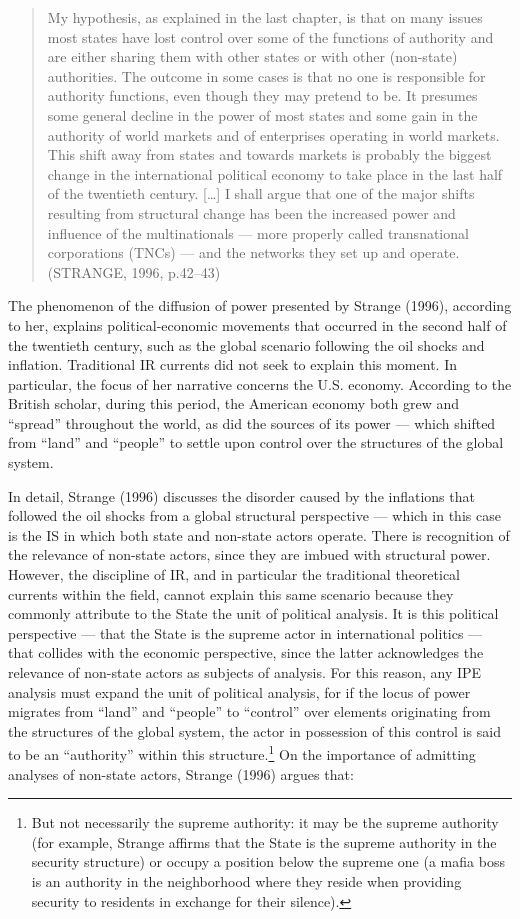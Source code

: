 \begin{quote}
My hypothesis, as explained in the last chapter, is that on many issues most states have lost control over some of the functions of authority and are either sharing them with other states or with other (non-state) authorities. The outcome in some cases is that no one is responsible for authority functions, even though they may pretend to be. It presumes some general decline in the power of most states and some gain in the authority of world markets and of enterprises operating in world markets. This shift away from states and towards markets is probably the biggest change in the international political economy to take place in the last half of the twentieth century. {[}\ldots{]} I shall argue that one of the major shifts resulting from structural change has been the increased power and influence of the multinationals --- more properly called transnational corporations (TNCs) --- and the networks they set up and operate. (STRANGE, 1996, p.42--43)
\end{quote}

The phenomenon of the diffusion of power presented by Strange (1996), according to her, explains political-economic movements that occurred in the second half of the twentieth century, such as the global scenario following the oil shocks and inflation. Traditional IR currents did not seek to explain this moment. In particular, the focus of her narrative concerns the U.S. economy. According to the British scholar, during this period, the American economy both grew and ``spread'' throughout the world, as did the sources of its power --- which shifted from ``land'' and ``people'' to settle upon control over the structures of the global system.

In detail, Strange (1996) discusses the disorder caused by the inflations that followed the oil shocks from a global structural perspective --- which in this case is the IS in which both state and non-state actors operate. There is recognition of the relevance of non-state actors, since they are imbued with structural power. However, the discipline of IR, and in particular the traditional theoretical currents within the field, cannot explain this same scenario because they commonly attribute to the State the unit of political analysis. It is this political perspective --- that the State is the supreme actor in international politics --- that collides with the economic perspective, since the latter acknowledges the relevance of non-state actors as subjects of analysis. For this reason, any IPE analysis must expand the unit of political analysis, for if the locus of power migrates from ``land'' and ``people'' to ``control'' over elements originating from the structures of the global system, the actor in possession of this control is said to be an ``authority'' within this structure.\footnote{But not necessarily the supreme authority: it may be the supreme authority (for example, Strange affirms that the State is the supreme authority in the security structure) or occupy a position below the supreme one (a mafia boss is an authority in the neighborhood where they reside when providing security to residents in exchange for their silence).} On the importance of admitting analyses of non-state actors, Strange (1996) argues that:

